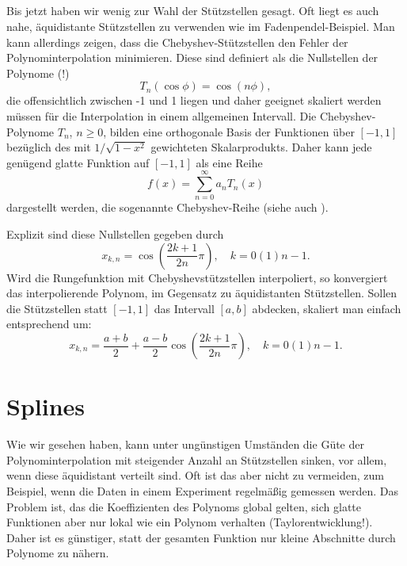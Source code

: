\subsection{}

Bis jetzt haben wir wenig zur Wahl der Stützstellen gesagt. Oft liegt
es auch nahe, äquidistante Stützstellen zu verwenden wie im
Fadenpendel-Beispiel. Man kann allerdings zeigen, dass die
Chebyshev-Stützstellen den Fehler der Polynominterpolation minimieren.
Diese sind definiert als die Nullstellen der Polynome (!)
\begin{equation}
  \label{eq:chebyshev}
  T_n(\cos\phi) = \cos(n\phi),
\end{equation}
die offensichtlich zwischen -1 und 1 liegen und daher geeignet
skaliert werden müssen für die Interpolation in einem allgemeinen
Intervall. Die Chebyshev-Polynome $T_n$, $n\ge 0$, bilden eine
orthogonale Basis der Funktionen über $[-1,1]$ bezüglich des mit
$1/\sqrt{1-x^2}$ gewichteten Skalarprodukts. Daher kann jede genügend
glatte Funktion auf $[-1,1]$ als eine Reihe
\begin{equation}
  f(x) = \sum_{n=0}^\infty a_n T_n(x)
\end{equation}
dargestellt werden, die sogenannte Chebyshev-Reihe (siehe auch \zb
\textcite{abramowitz70a}).

 Explizit sind diese Nullstellen gegeben durch
\begin{equation}
  x_{k,n} = \cos\left(\frac{2k+1}{2n}\pi\right),\quad k=0(1)n-1.
\end{equation}
Wird die Rungefunktion mit Chebyshevstützstellen interpoliert, so
konvergiert das interpolierende Polynom, im Gegensatz zu äquidistanten
Stützstellen. Sollen die Stützstellen statt $[-1,1]$ das Intervall
$[a,b]$ abdecken, skaliert man einfach entsprechend um:
\begin{equation}
  x_{k,n} = \frac{a+b}{2} + \frac{a-b}{2}\cos\left(\frac{2k+1}{2n}\pi\right),\quad k=0(1)n-1.
\end{equation}


\section{Splines}

Wie wir gesehen haben, kann unter ungünstigen Umständen die Güte der
Polynominterpolation mit steigender Anzahl an Stützstellen sinken, vor
allem, wenn diese äquidistant verteilt sind. Oft ist das aber nicht zu
vermeiden, zum Beispiel, wenn die Daten in einem Experiment regelmäßig
gemessen werden. Das Problem ist, das die Koeffizienten des Polynoms
global gelten, sich glatte Funktionen aber nur lokal wie ein Polynom
verhalten (Taylorentwicklung!). Daher ist es günstiger, statt der
gesamten Funktion nur kleine Abschnitte durch Polynome zu nähern.

